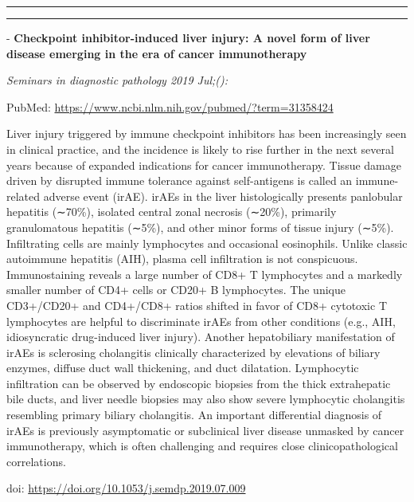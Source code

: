 \documentclass[]{article}
\begin{document}
{}

{}

\begin{center}\rule{0.5\linewidth}{\linethickness}\end{center}

\begin{center}\rule{0.5\linewidth}{\linethickness}\end{center}

 - \textbf{Checkpoint inhibitor-induced liver injury: A novel form of
liver disease emerging in the era of cancer immunotherapy}

\emph{Seminars in diagnostic pathology 2019 Jul;():}

PubMed: \url{https://www.ncbi.nlm.nih.gov/pubmed/?term=31358424}

Liver injury triggered by immune checkpoint inhibitors has been
increasingly seen in clinical practice, and the incidence is likely to
rise further in the next several years because of expanded indications
for cancer immunotherapy. Tissue damage driven by disrupted immune
tolerance against self-antigens is called an immune-related adverse
event (irAE). irAEs in the liver histologically presents panlobular
hepatitis (∼70\%), isolated central zonal necrosis (∼20\%), primarily
granulomatous hepatitis (∼5\%), and other minor forms of tissue injury
(∼5\%). Infiltrating cells are mainly lymphocytes and occasional
eosinophils. Unlike classic autoimmune hepatitis (AIH), plasma cell
infiltration is not conspicuous. Immunostaining reveals a large number
of CD8+ T lymphocytes and a markedly smaller number of CD4+ cells or
CD20+ B lymphocytes. The unique CD3+/CD20+ and CD4+/CD8+ ratios shifted
in favor of CD8+ cytotoxic T lymphocytes are helpful to discriminate
irAEs from other conditions (e.g., AIH, idiosyncratic drug-induced liver
injury). Another hepatobiliary manifestation of irAEs is sclerosing
cholangitis clinically characterized by elevations of biliary enzymes,
diffuse duct wall thickening, and duct dilatation. Lymphocytic
infiltration can be observed by endoscopic biopsies from the thick
extrahepatic bile ducts, and liver needle biopsies may also show severe
lymphocytic cholangitis resembling primary biliary cholangitis. An
important differential diagnosis of irAEs is previously asymptomatic or
subclinical liver disease unmasked by cancer immunotherapy, which is
often challenging and requires close clinicopathological correlations.

doi: \url{https://doi.org/10.1053/j.semdp.2019.07.009}
\end{document}
